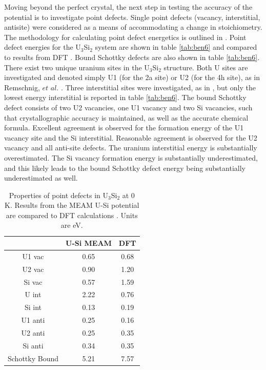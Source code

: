 \documentclass[review]{elsarticle}
\begin{document}
\FloatBarrier

Moving beyond the perfect crystal, the next step in testing the accuracy of the potential is to investigate point defects.  Single point defects (vacancy, interstitial, antisite) were considered as a means of accommodating a change in stoichiometry.  The methodology for calculating point defect energetics is outlined in \cite{middleburgh2016}.  Point defect energies for the U$_{3}$Si$_{2}$ system are shown in table \ref{tab:ben6} and compared to results from DFT \cite{middleburgh2016}.  Bound Schottky defects are also shown in table \ref{tab:ben6}.  There exist two unique uranium sites in the U$_{3}$Si$_{2}$ structure.  Both U sites are investigated and denoted simply U1 (for the 2a site) or U2 (for the 4h site), as in Remschnig, $\textit{et al.}$ \cite{remschnig1992}.  Three interstitial sites were investigated, as in \cite{middleburgh2016}, but only the lowest energy interstitial is reported in table \ref{tab:ben6}.  The bound Schottky defect consists of two U2 vacancies, one U1 vacancy and two Si vacancies, such that crystallographic accuracy is maintained, as well as the accurate chemical formula.  Excellent agreement is observed for the formation energy of the U1 vacancy site and the Si interstitial.  Reasonable agreement is observed for the U2 vacancy and all anti-site defects.  The uranium interstitial energy is substantially overestimated.  The Si vacancy formation energy is substantially underestimated, and this likely leads to the bound Schottky defect energy being substantially underestimated as well.       

\begin{table}[h!]
\caption{Properties of point defects in U$_{3}$Si$_{2}$ at 0 K.  Results from the MEAM U-Si potential are compared to DFT calculations \cite{middleburgh2016}.  Units are eV.}\label{tab:ben6}
\begin{center}
\begin{tabular}{|c|c|c|}
     \hline
      & U-Si MEAM & DFT \\
     \hline
     U1 vac & 0.65 & 0.68 \\
     U2 vac & 0.90 &  1.20 \\
     Si vac & 0.57 & 1.59 \\
     U int & 2.22 & 0.76 \\
     Si int & 0.13 & 0.19 \\
     U1 anti & 0.25 & 0.16 \\
     U2 anti & 0.25 & 0.35 \\
     Si anti & 0.34 & 0.35\\
     Schottky Bound &  5.21 & 7.57 \\
     \hline
\end{tabular}
\end{center}
\label{default}
\end{table}%
\end{document}
